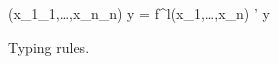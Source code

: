 \documentclass[runningheads]{llncs}
\begin{document}
\begin{figure}[t]

{\funenv {}(x_1\COL\typ_1,\dots,x_n\COL\typ_n) \mid \beta \p \LET y = f^l(x_1,\dots,x_n) \IN \expr \COL \typ \produces \tenv' \diff y}

\caption{Typing rules.}
\label{fig:typingRules}
\end{figure}



\end{document}

